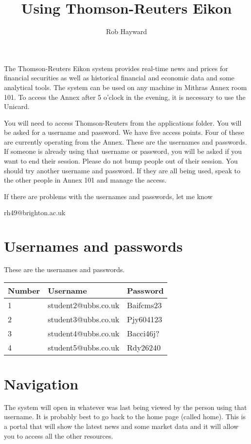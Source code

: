 \documentclass[12pt, a4paper, oneside]{article}\usepackage{graphicx, color}
\begin{document}
\title{Using Thomson-Reuters Eikon}
\author{Rob Hayward}
\maketitle
The Thomson-Reuters Eikon system provides real-time news and prices for financial securities as well as historical financial and economic data and some analytical tools.  The system can be used on any machine in Mithras Annex room 101.  To access the Annex after 5 o'clock in the evening, it is necessary to use the Unicard.  

You will need to access Thomson-Reuters from the applications folder.  You will be asked for a username and password.  We have five access points.  Four of these are currently operating from the Annex.  These are the usernames and passwords.  If someone is already using that username or password, you will be asked if you want to end their session. Please do not bump people out of their session. You should try another username and password.  If they are all being used, speak to the other people in Annex 101 and manage the access. 

If there are problems with the usernames and passwords, let me know 

rh49@brighton.ac.uk

\section*{Usernames and passwords}
These are the usernames and passwords. 

\hspace{6cm}

\begin{tabular}{l l l}
Number & Username & Password\\
\hline
1 & student2@ubbs.co.uk & Baifcms23\\
2 & student3@ubbs.co.uk & Pjy604123\\
3 & student4@ubbs.co.uk & Bacci46j? \\
4 & student5@ubbs.co.uk & Rdy26240\\
\end{tabular}

\section*{Navigation}
The system will open in whatever was last being viewed by the person using that username.  It is probably best to go back to the home page (called home).  This is a portal that will show the latest news and some market data and it will allow you to access all the other resources.  
\end{document}
